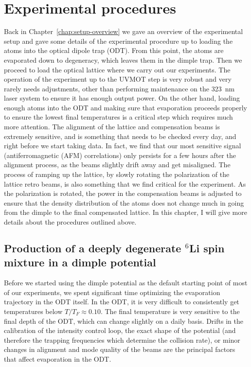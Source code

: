 \chapter{Experimental procedures}
\label{chap:expprocedures} 


Back in Chapter~\ref{chap:setup-overview} we gave an overview of the
experimental setup and gave some details of the experimental procedure up to
loading the atoms into the optical dipole trap (ODT).    From this point, the
atoms are evaporated down to degeneracy, which leaves them in the dimple trap.
Then we proceed to load the optical lattice where we carry out our experiments.
The operation of the experiment up to the UVMOT step is very robust and very
rarely needs adjustments, other than performing maintenance on the 323~nm laser
system to ensure it has enough output power.   On the other hand, loading
enough atoms into the ODT and making sure that evaporation proceeds properly to
ensure the lowest final temperatures is a critical step which requires much
more attention.   The alignment of the lattice and compensation beams is
extremely sensitive, and is something that needs to be checked every day, and
right before we start taking data.  In fact, we find that our most sensitive
signal (antiferromagnetic (AFM) correlations) only persists for a few hours
after the alignment process, as the beams slightly drift away and get
misaligned.   The process of ramping up the lattice, by slowly rotating the
polarization of the lattice retro beams, is also something that we find
critical for the experiment.  As the polarization is rotated, the power in the
compensation beams is adjusted to ensure that the density distribution of the
atoms does not change much in going from the dimple to the final compensated
lattice. In this chapter, I will give more details about the procedures
outlined above.

\section{Production of a deeply degenerate $^{6}$Li spin mixture in a dimple
potential }

Before we started using the dimple potential as the default starting point of
most of our experiments, we spent significant time optimizing the evaporation
trajectory in the ODT itself.   In the ODT, it is very difficult to
consistently get temperatures below $T/T_{F} \approx 0.10$.   The final
temperature is very sensitive to the final depth of the ODT, which can change
slightly on a daily basis. Drifts in the calibration of the intensity control
loop,  the exact shape of the potential (and therefore the trapping frequencies
which determine the collision rate), or minor changes in alignment and mode
quality of the beams are the principal factors that affect evaporation in the
ODT. 

